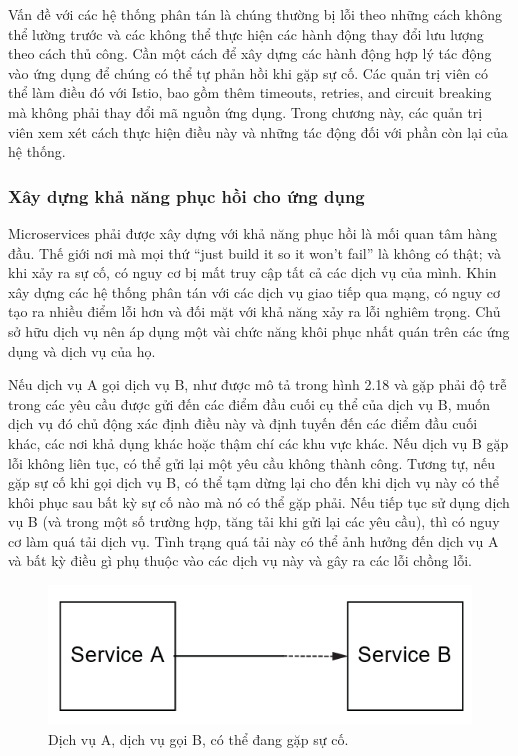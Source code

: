 \documentclass[14pt,a4paper]{book}
\begin{document}
Vấn đề với các hệ thống phân tán là chúng thường bị lỗi theo những cách không thể lường trước và các không thể thực hiện các hành động thay đổi lưu lượng theo cách thủ công. Cần một cách để xây dựng các hành động hợp lý tác động vào ứng dụng để chúng có thể tự phản hồi khi gặp sự cố. Các quản trị viên có thể làm điều đó với Istio, bao gồm thêm timeouts, retries, and circuit breaking mà không phải thay đổi mã nguồn ứng dụng. Trong chương này, các quản trị viên xem xét cách thực hiện điều này và những tác động đối với phần còn lại của hệ thống.
			\subsubsection{Xây dựng khả năng phục hồi cho ứng dụng}
\hspace{0.6cm}Microservices phải được xây dựng với khả năng phục hồi là mối quan tâm hàng đầu. Thế giới nơi mà mọi thứ “just build it so it won’t fail” là không có thật; và khi xảy ra sự cố, có nguy cơ bị mất truy cập tất cả các dịch vụ của mình. Khin xây dựng các hệ thống phân tán với các dịch vụ giao tiếp qua mạng, có nguy cơ tạo ra nhiều điểm lỗi hơn và đối mặt với khả năng xảy ra lỗi nghiêm trọng. Chủ sở hữu dịch vụ nên áp dụng một vài chức năng khôi phục nhất quán trên các ứng dụng và dịch vụ của họ.

Nếu dịch vụ A gọi dịch vụ B, như được mô tả trong hình 2.18 và gặp phải độ trễ trong các yêu cầu được gửi đến các điểm đầu cuối cụ thể của dịch vụ B, muốn dịch vụ đó chủ động xác định điều này và định tuyến đến các điểm đầu cuối khác, các nơi khả dụng khác hoặc thậm chí các khu vực khác. Nếu dịch vụ B gặp lỗi không liên tục, có thể gửi lại một yêu cầu không thành công. Tương tự, nếu gặp sự cố khi gọi dịch vụ B, có thể tạm dừng lại cho đến khi dịch vụ này có thể khôi phục sau bất kỳ sự cố nào mà nó có thể gặp phải. Nếu tiếp tục sử dụng dịch vụ B (và trong một số trường hợp, tăng tải khi gửi lại các yêu cầu), thì có nguy cơ làm quá tải dịch vụ. Tình trạng quá tải này có thể ảnh hưởng đến dịch vụ A và bất kỳ điều gì phụ thuộc vào các dịch vụ này và gây ra các lỗi chồng lỗi.
\begin{figure}[h]
	\centering
	\includegraphics[width=0.7\linewidth]{Pics/2.2.3-p1}
	\caption{Dịch vụ A, dịch vụ gọi B, có thể đang gặp sự cố.}
	\label{fig:2.2.3-1}
\end{figure}
\end{document}
